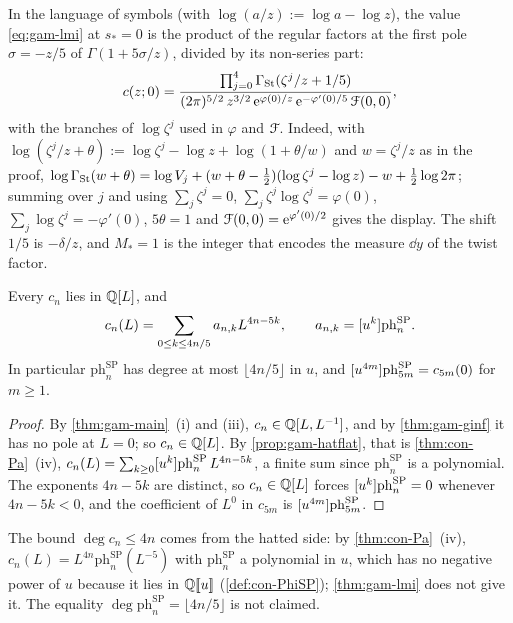 In the language of symbols (with $\log(a/z):=\log a-\log z$), the value \eqref{eq:gam-lmi} at $s_*=0$ is the product of the regular factors at the first pole $\sigma=-z/5$ of $\Gamma(1+5\sigma/z)$, divided by its non-series part:
\[
c(z;0)=\frac{\prod_{j=0}^4\Gamma_{\mathrm{St}}(\zeta^j/z+1/5)}{(2\pi)^{5/2}\,z^{3/2}\,\mathrm{e}^{\varphi(0)/z}\,\mathrm{e}^{-\varphi'(0)/5}\,\mathcal{F}(0,0)},
\]
with the branches of $\log\zeta^j$ used in $\varphi$ and $\mathcal{F}$. Indeed, with $\log(\zeta^j/z+\theta):=\log\zeta^j-\log z+\log(1+\theta/w)$ and $w=\zeta^j/z$ as in the proof, $\log\Gamma_{\mathrm{St}}(w+\theta)=\log V_j+(w+\theta-\frac12)(\log\zeta^j-\log z)-w+\frac12\log2\pi$; summing over $j$ and using $\sum_j\zeta^j=0$, $\sum_j\zeta^j\log\zeta^j=\varphi(0)$, $\sum_j\log\zeta^j=-\varphi'(0)$, $5\theta=1$ and $\mathcal{F}(0,0)=\mathrm{e}^{\varphi'(0)/2}$ gives the display. The shift $1/5$ is $-\delta/z$, and $M_*=1$ is the integer that encodes the measure $\dd y$ of the twist factor.

\begin{cor}
\label{cor:gam-poly}
Every $c_n$ lies in $\mathbb{Q}[L]$, and
\[
c_n(L)=\sum_{0\leq k\leq 4n/5}a_{n,k}L^{4n-5k},\qquad a_{n,k}=[u^k]\mathrm{ph}^{\mathrm{SP}}_n.
\]
In particular $\mathrm{ph}^{\mathrm{SP}}_n$ has degree at most $\lfloor 4n/5\rfloor$ in $u$, and $[u^{4m}]\mathrm{ph}^{\mathrm{SP}}_{5m}=c_{5m}(0)$ for $m\geq 1$.
\end{cor}

\begin{proof}
By \cref{thm:gam-main}~(i) and (iii), $c_n\in\mathbb{Q}[L,L^{-1}]$, and by \cref{thm:gam-ginf} it has no pole at $L=0$; so $c_n\in\mathbb{Q}[L]$. By \cref{prop:gam-hatflat}, that is \cref{thm:con-Pa}~(iv), $c_n(L)=\sum_{k\geq 0}[u^k]\mathrm{ph}^{\mathrm{SP}}_n\,L^{4n-5k}$, a finite sum since $\mathrm{ph}^{\mathrm{SP}}_n$ is a polynomial. The exponents $4n-5k$ are distinct, so $c_n\in\mathbb{Q}[L]$ forces $[u^k]\mathrm{ph}^{\mathrm{SP}}_n=0$ whenever $4n-5k<0$, and the coefficient of $L^0$ in $c_{5m}$ is $[u^{4m}]\mathrm{ph}^{\mathrm{SP}}_{5m}$.
\end{proof}

The bound $\deg c_n\leq 4n$ comes from the hatted side: by \cref{thm:con-Pa}~(iv), $c_n(L)=L^{4n}\mathrm{ph}^{\mathrm{SP}}_n(L^{-5})$ with $\mathrm{ph}^{\mathrm{SP}}_n$ a polynomial in $u$, which has no negative power of $u$ because it lies in $\mathbb{Q}[\![ u ]\!]$ (\cref{def:con-PhiSP}); \cref{thm:gam-lmi} does not give it. The equality $\deg\mathrm{ph}^{\mathrm{SP}}_n=\lfloor 4n/5\rfloor$ is not claimed.

